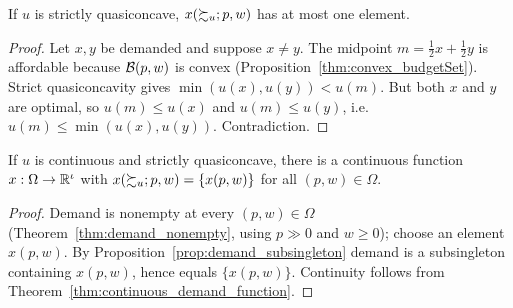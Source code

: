 \begin{proposition}
\label{prop:demand_subsingleton}
\leanok
{}
If $u$ is strictly quasiconcave, $x(\succsim_u; p, w)$ has at most one element.
\end{proposition}
\begin{proof}
\leanok
Let $x, y$ be demanded and suppose $x \neq y$. The midpoint $m = \tfrac12 x + \tfrac12 y$ is affordable
because $\mathcal{B}(p, w)$ is convex (Proposition~\ref{thm:convex_budgetSet}). Strict quasiconcavity gives
$\min(u(x), u(y)) < u(m)$. But both $x$ and $y$ are optimal, so $u(m) \le u(x)$ and $u(m) \le u(y)$,
i.e.\ $u(m) \le \min(u(x), u(y))$. Contradiction.
\end{proof}

\begin{theorem}
\label{thm:exists_continuous_demand}
\leanok
{}
If $u$ is continuous and strictly quasiconcave, there is a continuous function $x : \Omega \to \mathbb{R}^\iota$
with $x(\succsim_u; p, w) = \{x(p, w)\}$ for all $(p, w) \in \Omega$.
\end{theorem}
\begin{proof}
\leanok
Demand is nonempty at every $(p, w) \in \Omega$ (Theorem~\ref{thm:demand_nonempty}, using $p \gg 0$ and
$w \ge 0$); choose an element $x(p, w)$. By Proposition~\ref{prop:demand_subsingleton} demand is a
subsingleton containing $x(p, w)$, hence equals $\{x(p, w)\}$. Continuity follows from
Theorem~\ref{thm:continuous_demand_function}.
\end{proof}
